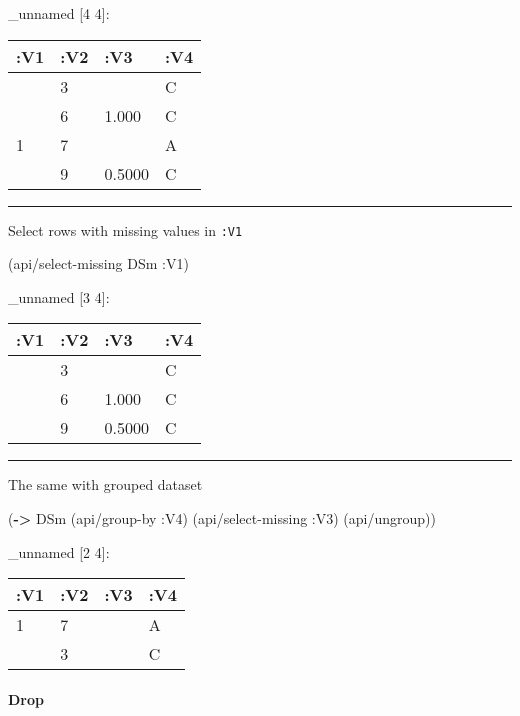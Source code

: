 \documentclass[]{article}
\newenvironment{Shaded}{\begin{snugshade}}{\end{snugshade}}
\newcommand{\KeywordTok}[1]{\textcolor[rgb]{0.13,0.29,0.53}{\textbf{#1}}}
\newcommand{\AttributeTok}[1]{\textcolor[rgb]{0.77,0.63,0.00}{#1}}
\newcommand{\NormalTok}[1]{#1}
\let\oldparagraph\paragraph
\renewcommand{\paragraph}[1]{\oldparagraph{#1}\mbox{}}
\begin{document}
\_unnamed {[}4 4{]}:

\begin{longtable}[]{@{}llll@{}}
\toprule
:V1 & :V2 & :V3 & :V4\tabularnewline
\midrule
\endhead
& 3 & & C\tabularnewline
& 6 & 1.000 & C\tabularnewline
1 & 7 & & A\tabularnewline
& 9 & 0.5000 & C\tabularnewline
\bottomrule
\end{longtable}

\begin{center}\rule{0.5\linewidth}{0.5pt}\end{center}

Select rows with missing values in \texttt{:V1}

\begin{Shaded}
\begin{Highlighting}[]
\NormalTok{(api/select-missing DSm }\AttributeTok{:V1}\NormalTok{)}
\end{Highlighting}
\end{Shaded}

\_unnamed {[}3 4{]}:

\begin{longtable}[]{@{}llll@{}}
\toprule
:V1 & :V2 & :V3 & :V4\tabularnewline
\midrule
\endhead
& 3 & & C\tabularnewline
& 6 & 1.000 & C\tabularnewline
& 9 & 0.5000 & C\tabularnewline
\bottomrule
\end{longtable}

\begin{center}\rule{0.5\linewidth}{0.5pt}\end{center}

The same with grouped dataset

\begin{Shaded}
\begin{Highlighting}[]
\NormalTok{(}\KeywordTok{->}\NormalTok{ DSm}
\NormalTok{    (api/group-by }\AttributeTok{:V4}\NormalTok{)}
\NormalTok{    (api/select-missing }\AttributeTok{:V3}\NormalTok{)}
\NormalTok{    (api/ungroup))}
\end{Highlighting}
\end{Shaded}

\_unnamed {[}2 4{]}:

\begin{longtable}[]{@{}llll@{}}
\toprule
:V1 & :V2 & :V3 & :V4\tabularnewline
\midrule
\endhead
1 & 7 & & A\tabularnewline
& 3 & & C\tabularnewline
\bottomrule
\end{longtable}

\paragraph{Drop}\label{drop-2}
\end{document}
